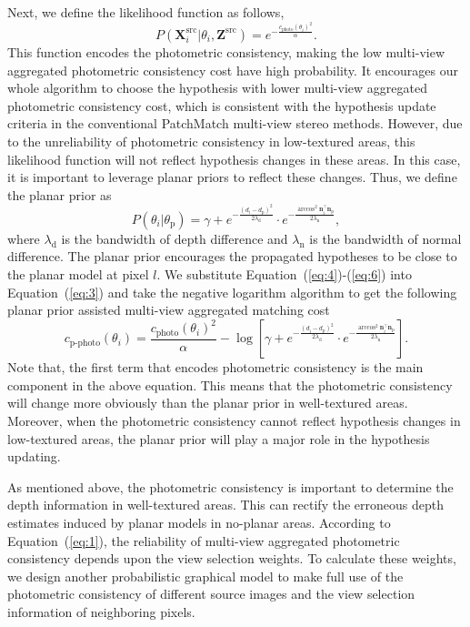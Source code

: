 \documentclass[letterpaper]{article} %
\begin{document}
Next, we define the likelihood function as follows,
\begin{equation}\label{eq:5}
P(\boldsymbol{X}_{i}^{\text{src}}|\theta_{i},\boldsymbol{Z}^{\text{src}})=e^{-\frac{c_{\text{photo}}(\theta_{i})^2}{\alpha}}.
\end{equation}
This function encodes the photometric consistency, making the low multi-view aggregated photometric consistency cost have high probability. It encourages our whole algorithm to choose the hypothesis with lower multi-view aggregated photometric consistency cost, which is consistent with the hypothesis update criteria in the conventional PatchMatch multi-view stereo methods. However, due to the unreliability of photometric consistency in low-textured areas, this likelihood function will not reflect hypothesis changes in these areas. In this case, it is important to leverage planar priors to reflect these changes. Thus, we define the planar prior as
\begin{equation}\label{eq:6}
P(\theta_{i}|\theta_{\text{p}})=\gamma+e^{-\frac{(d_{i}-d_{\text{p}})^2}{2\lambda_\text{d}}}\cdot e^{-\frac{{\arccos^2}\boldsymbol{n}_{i}^{\top}\boldsymbol{n}_{\text{p}}}{2\lambda_{\text{n}}}},
\end{equation}
where $\lambda_\text{d}$ is the bandwidth of depth difference and $\lambda_\text{n}$ is the bandwidth of normal difference. The planar prior encourages the propagated hypotheses to be close to the planar model at pixel $l$. We substitute Equation~(\ref{eq:4})-(\ref{eq:6}) into Equation~(\ref{eq:3}) and take the negative logarithm algorithm to get the following planar prior assisted multi-view aggregated matching cost
\begin{equation}\label{eq:7}
c_\text{p-photo}(\theta_{i})=\frac{c_\text{photo}(\theta_{i})^2}{\alpha}-\log[\gamma+e^{-\frac{(d_{i}-d_{\text{p}})^2}{2\lambda_\text{d}}}\cdot e^{-\frac{{\arccos^2}\boldsymbol{n}_{i}^{\top}\boldsymbol{n}_{\text{p}}}{2\lambda_{\text{n}}}}].
\end{equation} 
Note that, the first term that encodes photometric consistency is the main component in the above equation. This means that the photometric consistency will change more obviously than the planar prior in well-textured areas. Moreover, when the photometric consistency cannot reflect hypothesis changes in low-textured areas, the planar prior will play a major role in the hypothesis updating.

As mentioned above, the photometric consistency is important to determine the depth information in well-textured areas. This can rectify the erroneous depth estimates induced by planar models in no-planar areas. According to Equation~(\ref{eq:1}), the reliability of multi-view aggregated photometric consistency depends upon the view selection weights. To calculate these weights, we design another probabilistic graphical model to make full use of the photometric consistency of different source images and the view selection information of neighboring pixels.     
\end{document}
